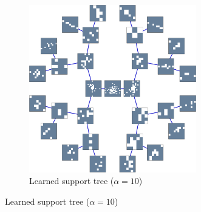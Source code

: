 \begin{figure}[!h]
\begin{subfigure}[b]{0.49\textwidth}
\includegraphics[width=0.8\textwidth]{figures/tree-unbalanced-supp/xp_learnsupp256_curvelet_decomp3[tree-binary_dpth4]_supp-diracs_[usegrad1_every5_add5_totinit0_totadd279_alpha10]_tree.pdf}
\caption{Learned support tree ($\alpha=10$)}
\end{subfigure}
\end{figure}
